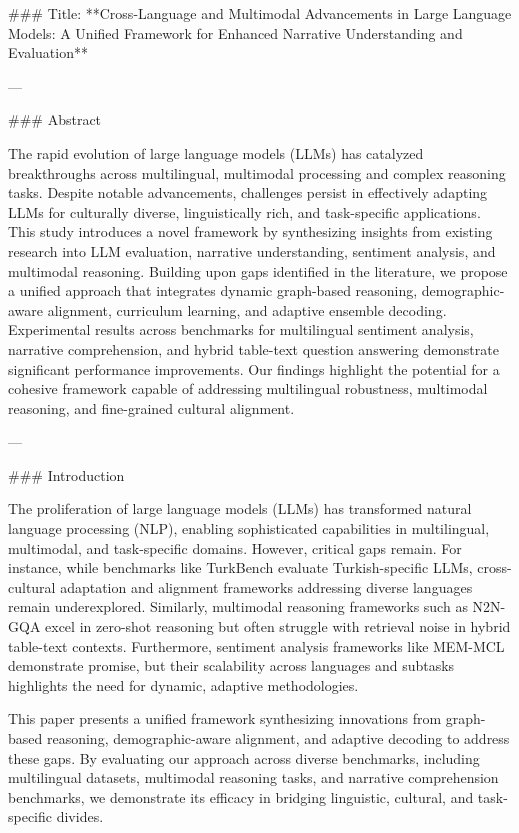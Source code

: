 ### Title: **Cross-Language and Multimodal Advancements in Large Language Models: A Unified Framework for Enhanced Narrative Understanding and Evaluation**

---

### Abstract

The rapid evolution of large language models (LLMs) has catalyzed breakthroughs across multilingual, multimodal processing and complex reasoning tasks. Despite notable advancements, challenges persist in effectively adapting LLMs for culturally diverse, linguistically rich, and task-specific applications. This study introduces a novel framework by synthesizing insights from existing research into LLM evaluation, narrative understanding, sentiment analysis, and multimodal reasoning. Building upon gaps identified in the literature, we propose a unified approach that integrates dynamic graph-based reasoning, demographic-aware alignment, curriculum learning, and adaptive ensemble decoding. Experimental results across benchmarks for multilingual sentiment analysis, narrative comprehension, and hybrid table-text question answering demonstrate significant performance improvements. Our findings highlight the potential for a cohesive framework capable of addressing multilingual robustness, multimodal reasoning, and fine-grained cultural alignment.

---

### Introduction

The proliferation of large language models (LLMs) has transformed natural language processing (NLP), enabling sophisticated capabilities in multilingual, multimodal, and task-specific domains. However, critical gaps remain. For instance, while benchmarks like TurkBench evaluate Turkish-specific LLMs, cross-cultural adaptation and alignment frameworks addressing diverse languages remain underexplored. Similarly, multimodal reasoning frameworks such as N2N-GQA excel in zero-shot reasoning but often struggle with retrieval noise in hybrid table-text contexts. Furthermore, sentiment analysis frameworks like MEM-MCL demonstrate promise, but their scalability across languages and subtasks highlights the need for dynamic, adaptive methodologies.

This paper presents a unified framework synthesizing innovations from graph-based reasoning, demographic-aware alignment, and adaptive decoding to address these gaps. By evaluating our approach across diverse benchmarks, including multilingual datasets, multimodal reasoning tasks, and narrative comprehension benchmarks, we demonstrate its efficacy in bridging linguistic, cultural, and task-specific divides.

